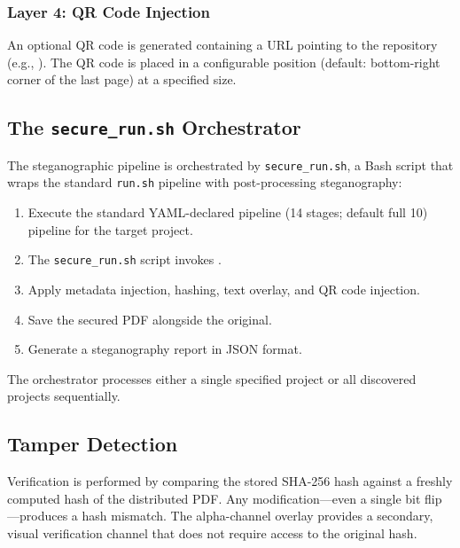 \documentclass[
]{article}
\providecommand{\tightlist}{%
  \setlength{\itemsep}{0pt}\setlength{\parskip}{0pt}}
\begin{document}
\subsubsection{Layer 4: QR Code
Injection}\label{layer-4-qr-code-injection}

An optional QR code is generated containing a URL pointing to the
repository (e.g., ). The QR code
is placed in a configurable position (default: bottom-right corner of
the last page) at a specified size.

\subsection{\texorpdfstring{The \texttt{secure\_run.sh}
Orchestrator}{The secure_run.sh Orchestrator}}\label{the-secure_run.sh-orchestrator}

The steganographic pipeline is orchestrated by \texttt{secure\_run.sh},
a Bash script that wraps the standard \texttt{run.sh} pipeline with
post-processing steganography:

\begin{enumerate}
\def\labelenumi{\arabic{enumi}.}
\tightlist
\item
  Execute the standard YAML-declared pipeline (14 stages; default full
  10) pipeline for the target project.
\item
  The \texttt{secure\_run.sh} script invokes
  .
\item
  Apply metadata injection, hashing, text overlay, and QR code
  injection.
\item
  Save the secured PDF alongside the original.
\item
  Generate a steganography report in JSON format.
\end{enumerate}

The orchestrator processes either a single specified project or all
discovered projects sequentially.

\subsection{Tamper Detection}\label{tamper-detection}

Verification is performed by comparing the stored SHA-256 hash against a
freshly computed hash of the distributed PDF. Any modification---even a
single bit flip---produces a hash mismatch. The alpha-channel overlay
provides a secondary, visual verification channel that does not require
access to the original hash.
\end{document}
